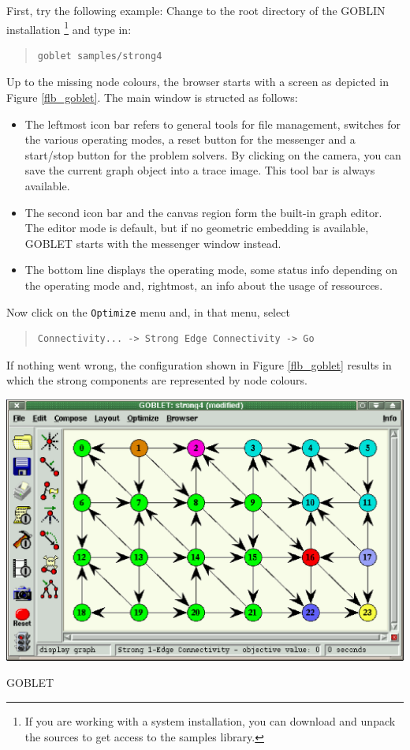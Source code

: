 \documentclass[a4paper,11pt,twoside]{book}
\begin{document}
\begin{multicols}{2}
First, try the following example: Change to the root directory of the GOBLIN
installation
\footnote{If you are working with a system installation, you can download and
unpack the sources to get access to the samples library.}
and type in:
\begin{quote}
\begin{verbatim}
goblet samples/strong4
\end{verbatim}
\end{quote}
Up to the missing node colours, the browser starts with a screen as depicted
in Figure \ref{flb_goblet}. The main window is structed as follows:
\begin{itemize}
\item The leftmost icon bar refers to general tools for file management,
switches for the various operating modes, a reset button for the messenger
and a start/stop button for the problem solvers. By clicking on the camera,
you can save the current graph object into a trace image. This tool bar is
always available.
\item The second icon bar and the canvas region form the built-in graph editor.
The editor mode is default, but if no geometric embedding is available, GOBLET
starts with the messenger window instead.
\item The bottom line displays the operating mode, some status info depending
on the operating mode and, rightmost, an info about the usage of ressources.
\end{itemize}
Now click on the \verb/Optimize/ menu and, in that menu, select
\begin{quote}
\begin{verbatim}
Connectivity... -> Strong Edge Connectivity -> Go
\end{verbatim}
\end{quote}
If nothing went wrong, the configuration shown in Figure \ref{flb_goblet}
results in which the strong components are represented by node colours.

\bigskip
\begin{figurehere}
\begin{center}
\includegraphics*[scale=0.5]{goblet.ps}
\vspace{0.5cm}
\caption{\label{flb_goblet}GOBLET}
\end{center}
\end{figurehere}


\end{multicols}
\end{document}
